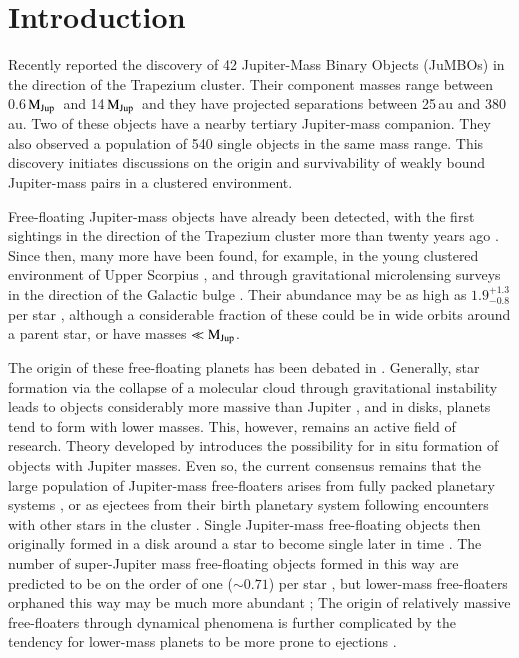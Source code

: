 \documentclass[submission,phys]{lib/SciPost}
\newcommand{\MJup}{\mbox{$\mathrm{{M}}_{\rm Jup}$}}
\newcommand{\jumbos}{\mbox{JuMBOs}}
\begin{document}
\section{Introduction}

Recently \cite{2023arXiv231001231P} reported the discovery of 42
Jupiter-Mass Binary Objects (\jumbos) in the direction of the
Trapezium cluster.  Their component masses range between 0.6\,\MJup\,
and 14\,\MJup\, and they have projected separations between 25\,au and
380\,au.  Two of these objects have a nearby tertiary Jupiter-mass
companion.  They also observed a population of 540 single objects in
the same mass range. This discovery initiates
discussions on the origin and survivability of weakly bound
Jupiter-mass pairs in a clustered environment.

Free-floating Jupiter-mass objects have already been detected, with the first 
sightings in the direction of the Trapezium cluster more than twenty years ago \cite{2000Sci...290..103Z,2000MNRAS.314..858L,2000AGM....17..A11M}.
Since then, many more have been found, for example, in the young
clustered environment of Upper Scorpius \cite{2022NatAs...6...89M},
and through gravitational microlensing surveys in the direction of the
Galactic bulge \cite{2011Natur.473..349S}.  Their abundance may be as
high as $1.9^{+1.3}_{-0.8}$ per star \cite{2011Natur.473..349S},
although a considerable fraction of these could be in wide orbits
around a parent star, or have masses $\ll \MJup$.

The origin of these free-floating planets has been debated in
\cite{2023Ap&SS.368...17M}. Generally, star formation via the collapse
of a molecular cloud through gravitational instability leads to
objects considerably more massive than Jupiter
\cite{1976MNRAS.176..367L,2005A&A...430.1059B}, and in disks, planets
tend to form with lower masses. This, however, remains an active field
of research. Theory developed by \cite{2006A&A...458..817W} introduces
the possibility for in situ formation of objects with Jupiter
masses. Even so, the current consensus remains that the large
population of Jupiter-mass free-floaters arises from fully packed
planetary systems \cite{2023arXiv231015603C}, or as ejectees from
their birth planetary system following encounters with other stars in
the cluster \cite{2019A&A...624A.120V}.  Single Jupiter-mass
free-floating objects then originally formed in a disk around a star
to become single later in time
\cite{1996Sci...274..954R,2015MNRAS.453.2759Z,2002ApJ...565.1251H,
  2017MNRAS.470.4337C, 2019MNRAS.489.2280F,2019A&A...624A.120V}.  The
number of super-Jupiter mass free-floating objects formed in this way
are predicted to be on the order of one ($\sim 0.71$) per star
\cite{2019A&A...624A.120V}, but lower-mass free-floaters orphaned this
way may be much more abundant \cite{2002ApJ...565.1251H}; The origin
of relatively massive free-floaters through dynamical phenomena is
further complicated by the tendency for lower-mass planets to be more
prone to ejections \cite{2001Icar..150..303F,2013MNRAS.433..867H,
  2019MNRAS.489.2280F,2020MNRAS.497.1807S}.
\end{document}
